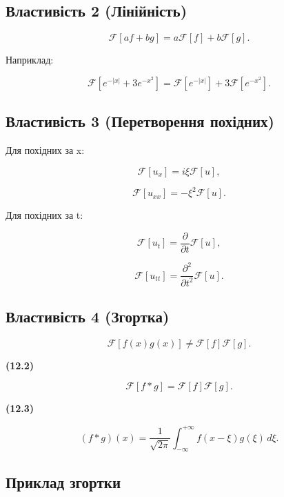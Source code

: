 \documentclass[
  ukrainian,
]{article}
\begin{document}
\subsection{Властивість 2
(Лінійність)}\label{ux432ux43bux430ux441ux442ux438ux432ux456ux441ux442ux44c-2-ux43bux456ux43dux456ux439ux43dux456ux441ux442ux44c}

\[
\mathcal{F}[af+bg] = a\mathcal{F}[f] + b\mathcal{F}[g].
\]

Наприклад:

\[
\mathcal{F}\left[e^{-|x|} + 3e^{-x^2}\right]
= \mathcal{F}\left[e^{-|x|}\right] + 3\mathcal{F}\left[e^{-x^2}\right].
\]

\subsection{Властивість 3 (Перетворення
похідних)}\label{ux432ux43bux430ux441ux442ux438ux432ux456ux441ux442ux44c-3-ux43fux435ux440ux435ux442ux432ux43eux440ux435ux43dux43dux44f-ux43fux43eux445ux456ux434ux43dux438ux445}

Для похідних за x:

\[
\mathcal{F}[u_x] = i\xi \mathcal{F}[u],
\]

\[
\mathcal{F}[u_{xx}] = -\xi^2 \mathcal{F}[u].
\]

Для похідних за t:

\[
\mathcal{F}[u_t] = \frac{\partial}{\partial t}\mathcal{F}[u],
\]

\[
\mathcal{F}[u_{tt}] = \frac{\partial^2}{\partial t^2}\mathcal{F}[u].
\]

\subsection{Властивість 4
(Згортка)}\label{ux432ux43bux430ux441ux442ux438ux432ux456ux441ux442ux44c-4-ux437ux433ux43eux440ux442ux43aux430}

\[
\mathcal{F}[f(x)g(x)] \neq \mathcal{F}[f]\mathcal{F}[g].
\]

\textbf{(12.2)}

\[
\mathcal{F}[f*g] = \mathcal{F}[f]\mathcal{F}[g].
\]

\textbf{(12.3)}

\[
(f*g)(x) = \frac{1}{\sqrt{2\pi}} \int_{-\infty}^{+\infty} f(x-\xi)g(\xi)\,d\xi.
\]

\subsection{Приклад
згортки}\label{ux43fux440ux438ux43aux43bux430ux434-ux437ux433ux43eux440ux442ux43aux438}
\end{document}
